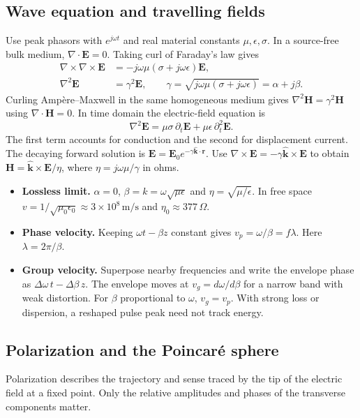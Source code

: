 \documentclass[12pt,a4paper]{article}
\begin{document}
\subsection{Wave equation and travelling fields}
Use peak phasors with $e^{j\omega t}$ and real material constants $\mu,\epsilon,\sigma$. In a source-free bulk medium, $\nabla\cdot\mathbf E=0$. Taking curl of Faraday's law gives
\[
\begin{aligned}
\nabla\times\nabla\times\mathbf E
 &=-j\omega\mu(\sigma+j\omega\epsilon)\mathbf E,\\
\nabla^2\mathbf E&=\gamma^2\mathbf E,\qquad
\gamma=\sqrt{j\omega\mu(\sigma+j\omega\epsilon)}=\alpha+j\beta .
\end{aligned}
\]
Curling Amp\`ere--Maxwell in the same homogeneous medium gives $\nabla^2\mathbf H=\gamma^2\mathbf H$ using $\nabla\cdot\mathbf H=0$. In time domain the electric-field equation is
\[
 \nabla^2\mathbf E=\mu\sigma\,\partial_t\mathbf E+
                      \mu\epsilon\,\partial_t^2\mathbf E.
\]
The first term accounts for conduction and the second for displacement current.
The decaying forward solution is $\mathbf E=\mathbf E_0e^{-\gamma\hat{\mathbf k}\cdot\mathbf r}$. Use $\nabla\times\mathbf E=-\gamma\hat{\mathbf k}\times\mathbf E$ to obtain $\mathbf H=\hat{\mathbf k}\times\mathbf E/\eta$, where $\eta=j\omega\mu/\gamma$ in ohms.
\begin{itemize}[leftmargin=*,itemsep=3pt]
\item \textbf{Lossless limit.} $\alpha=0$, $\beta=k=\omega\sqrt{\mu\epsilon}$ and $\eta=\sqrt{\mu/\epsilon}$. In free space $v=1/\sqrt{\mu_0\epsilon_0}\approx 3\times10^8\,\mathrm{m/s}$ and $\eta_0\approx377\,\Omega$.
\item \textbf{Phase velocity.} Keeping $\omega t-\beta z$ constant gives $v_p=\omega/\beta=f\lambda$. Here $\lambda=2\pi/\beta$.
\item \textbf{Group velocity.} Superpose nearby frequencies and write the envelope phase as $\Delta\omega\,t-\Delta\beta\,z$. The envelope moves at $v_g=d\omega/d\beta$ for a narrow band with weak distortion. For $\beta$ proportional to $\omega$, $v_g=v_p$. With strong loss or dispersion, a reshaped pulse peak need not track energy.
\end{itemize}

\subsection{Polarization and the Poincar\'e sphere}
\begin{tcolorbox}[defbox,title={Polarization}]
Polarization describes the trajectory and sense traced by the tip of the electric field at a fixed point. Only the relative amplitudes and phases of the transverse components matter.
\end{tcolorbox}
\end{document}
